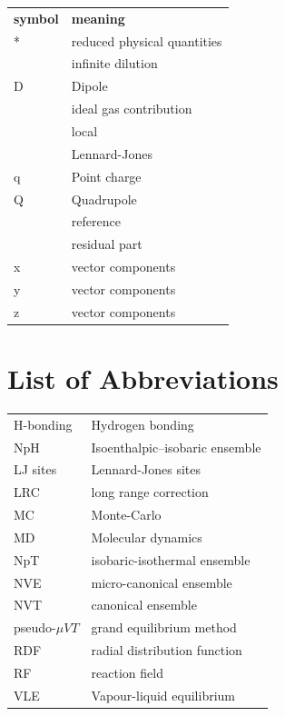 {	\begin{longtable}{Z l} 
		\textbf{symbol} & \textbf{meaning} \\
		\addlinespace
		\endhead
		*     & reduced physical quantities \\
		\inf  & infinite dilution \\
		D    & Dipole\\
		    & ideal gas contribution \\
		     & local\\
		    & Lennard-Jones\\
		q     & Point charge\\
		Q    & Quadrupole \\
		   & reference \\
		   & residual part \\
		x     &  vector components \\
		y     &  vector components \\
		z     &  vector components \\
		
		
		
		
	\end{longtable}
	
	
	
	\section*{List of Abbreviations}
	
	\begin{longtable}{ A l}
		
		H-bonding & Hydrogen bonding \\
		NpH   & Isoenthalpic–isobaric ensemble \\
		LJ sites & Lennard-Jones sites \\
		LRC   & long range correction \\
		MC    & Monte-Carlo \\
		MD    & Molecular dynamics \\
		NpT   & isobaric-isothermal ensemble  \\
		NVE   & micro-canonical ensemble  \\
		NVT   & canonical ensemble \\
		pseudo-$\mu V T$ & grand equilibrium method \\
		RDF   & radial distribution function \\
		RF & reaction field   \\
		VLE   & Vapour-liquid equilibrium \\
		
		
		
		
	\end{longtable}
}



